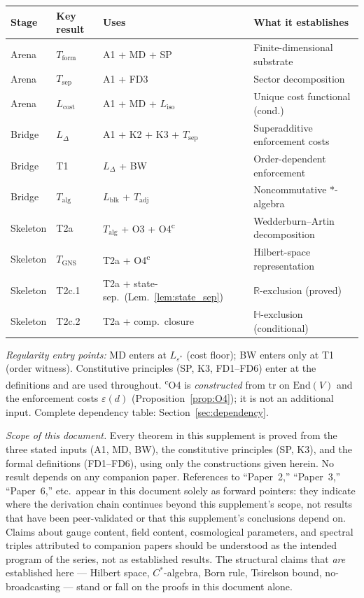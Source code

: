 \documentclass[11pt,a4paper]{article}
\theoremstyle{definition}
\newcommand{\eps}{\varepsilon}
\newcommand{\End}{\mathrm{End}}
\newcommand{\tr}{\mathrm{tr}}
\begin{document}
\medskip
\begin{center}
\small
\begin{tabular}{@{}llll@{}}
\toprule
\textbf{Stage} & \textbf{Key result} & \textbf{Uses} & \textbf{What it establishes} \\
\midrule
Arena & $T_{\mathrm{form}}$ & A1 + MD + SP & Finite-dimensional substrate \\
Arena & $T_{\mathrm{sep}}$ & A1 + FD3 & Sector decomposition \\
Arena & $L_{\mathrm{cost}}$ & A1 + MD + $L_{\mathrm{iso}}$ & Unique cost functional (cond.) \\
Bridge & $L_\Delta$ & A1 + K2 + K3 + $T_{\mathrm{sep}}$ & Superadditive enforcement costs \\
Bridge & T1 & $L_\Delta$ + BW & Order-dependent enforcement \\
Bridge & $T_{\mathrm{alg}}$ & $L_{\mathrm{blk}}$ + $T_{\mathrm{adj}}$ & Noncommutative $*$-algebra \\
Skeleton & T2a & $T_{\mathrm{alg}}$ + O3 + O4\textsuperscript{c} & Wedderburn--Artin decomposition \\
Skeleton & $T_{\mathrm{GNS}}$ & T2a + O4\textsuperscript{c} & Hilbert-space representation \\
Skeleton & T2c.1 & T2a + state-sep.\ (Lem.~\ref{lem:state_sep}) & $\mathbb{R}$-exclusion (proved) \\
Skeleton & T2c.2 & T2a + comp.\ closure & $\mathbb{H}$-exclusion (conditional) \\
\bottomrule
\end{tabular}
\end{center}
\smallskip\noindent\textit{Regularity entry points:}  MD enters at $L_{\eps^*}$ (cost floor); BW enters only at T1 (order witness).  Constitutive principles (SP, K3, FD1--FD6) enter at the definitions and are used throughout.  \textsuperscript{c}O4 is \emph{constructed} from $\tr$ on $\End(V)$ and the enforcement costs $\eps(d)$ (Proposition~\ref{prop:O4}); it is not an additional input.  Complete dependency table: Section~\ref{sec:dependency}.

\smallskip\noindent\textit{Scope of this document.}  Every theorem in this supplement is proved from the three stated inputs (A1, MD, BW), the constitutive principles (SP, K3), and the formal definitions (FD1--FD6), using only the constructions given herein.  No result depends on any companion paper.  References to ``Paper~2,'' ``Paper~3,'' ``Paper~6,'' etc.\ appear in this document solely as forward pointers: they indicate where the derivation chain continues beyond this supplement's scope, not results that have been peer-validated or that this supplement's conclusions depend on.  Claims about gauge content, field content, cosmological parameters, and spectral triples attributed to companion papers should be understood as the intended program of the series, not as established results.  The structural claims that \emph{are} established here --- Hilbert space, $C^*$-algebra, Born rule, Tsirelson bound, no-broadcasting --- stand or fall on the proofs in this document alone.
\end{document}
